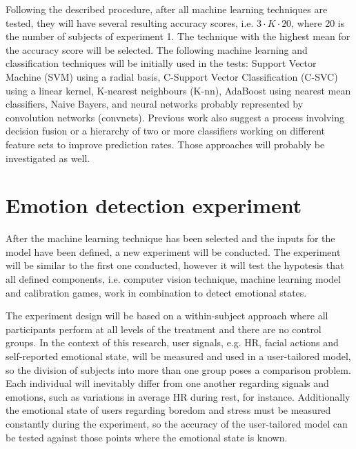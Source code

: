 Following the described procedure, after all machine learning techniques are tested, they will have several resulting accuracy scores, i.e. $3 \cdot K \cdot 20$, where 20 is the number of subjects of experiment 1. The technique with the highest mean for the accuracy score will be selected. The following machine learning and classification techniques will be initially used in the tests: Support Vector Machine (SVM) using a radial basis, C-Support Vector Classification (C-SVC) using a linear kernel, K-nearest neighbours (K-nn), AdaBoost using nearest mean classifiers, Naive Bayers, and neural networks probably represented by convolution networks (convnets). Previous work also suggest a process involving decision fusion or a hierarchy of two or more classifiers working on different feature sets to improve prediction rates. Those approaches will probably be investigated as well.

\section{Emotion detection experiment}
\label{closing:emotion-detection-experiment}

After the machine learning technique has been selected and the inputs for the model have been defined, a new experiment will be conducted. The experiment will be similar to the first one conducted, however it will test the hypotesis that all defined components, i.e. computer vision technique, machine learning model and calibration games, work in combination to detect emotional states.

The experiment design will be based on a within-subject approach \cite{lane2015online} where all participants perform at all levels of the treatment and there are no control groups. In the context of this research, user signals, e.g. HR, facial actions and self-reported emotional state, will be measured and used in a user-tailored model, so the division of subjects into more than one group poses a comparison problem. Each individual will inevitably differ from one another regarding signals and emotions, such as variations in average HR during rest, for instance. Additionally the emotional state of users regarding boredom and stress must be measured constantly during the experiment, so the accuracy of the user-tailored model can be tested against those points where the emotional state is known.

